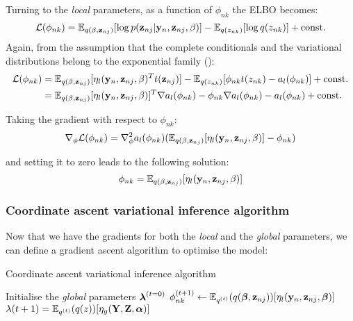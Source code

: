 Turning to the \textit{local} parameters, as a function of $\phi_{nk}$ the ELBO becomes:
\[
	\mathcal{L}(\phi_{nk}) = \mathbb{E}_{q(\beta,{\bf z}_{nj})}[\log p({\bf z}_{nj}|{\bf y}_{n},{\bf z}_{nj}, \beta)] - \mathbb{E}_{q(z_{nk})}[\log q(z_{nk})] + {\rm const.}
\]
Again, from the assumption that the complete conditionals and the variational distributions belong to the exponential family ():
\begin{align*}
	\mathcal{L}(\phi_{nk}) &= \mathbb{E}_{q(\beta,{\bf z}_{nj})}[\eta_l({\bf y}_n,{\bf z}_{nj},\beta)^T t({\bf z}_{nj})] - \mathbb{E}_{q(z_{nk})}[\phi_{nk} t(z_{nk}) - a_l(\phi_{nk}) ] + {\rm const.} \\
	&= \mathbb{E}_{q(\beta,{\bf z}_{nj})}[\eta_l({\bf y}_n,{\bf z}_{nj},\beta)]^T \nabla a_l(\phi_{nk}) - \phi_{nk} \nabla a_l(\phi_{nk}) - a_l(\phi_{nk}) + {\rm const.}
\end{align*}

Taking the gradient with respect to $\phi_{nk}$:
\begin{equation} \label{gradient_local}
	\nabla_{\phi} \mathcal{L}(\phi_{nk}) = \nabla_{\phi}^2 a_l(\phi_{nk}) (\mathbb{E}_{q(\beta,{\bf z}_{nj})}[\eta_l({\bf y}_n,{\bf z}_{nj},\beta)] - \phi_{nk})
\end{equation}

and setting it to zero leads to the following solution:
\begin{equation} \label{solution_local}
	\phi_{nk} = \mathbb{E}_{q(\beta,{\bf z}_{nj})}[\eta_l({\bf y}_{n},{\bf z}_{nj},\beta)]
\end{equation}


\subsubsection{Coordinate ascent variational inference algorithm}

Now that we have the gradients for both the \textit{local} and the \textit{global} parameters, we can define a gradient ascent algorithm to optimise the model:

\begin{algorithm}
  \caption{Coordinate ascent variational inference algorithm}
  \begin{algorithmic}[1]
	\State Initialise the \textit{global} parameters $\mbox{\boldmath $\lambda$}^{(t=0)}$
	\Repeat
			\State $ \phi_{nk}^{(t+1)} \gets \mathbb{E}_{q^{(t)}}(q(\mbox{\boldmath $\beta$},{\bf z}_{nj}))[\eta_l({\bf y}_{n},{\bf z}_{nj},\mbox{\boldmath $\beta$})] $
      	\EndFor
			\State $ \lambda{(t+1)}= \mathbb{E}_{q^{(t)}}(q(z))[\eta_g({\bf Y},{\bf Z},\mbox{\boldmath $\alpha$})] $
      	\EndFor
	\end{algorithmic}
\end{algorithm}

